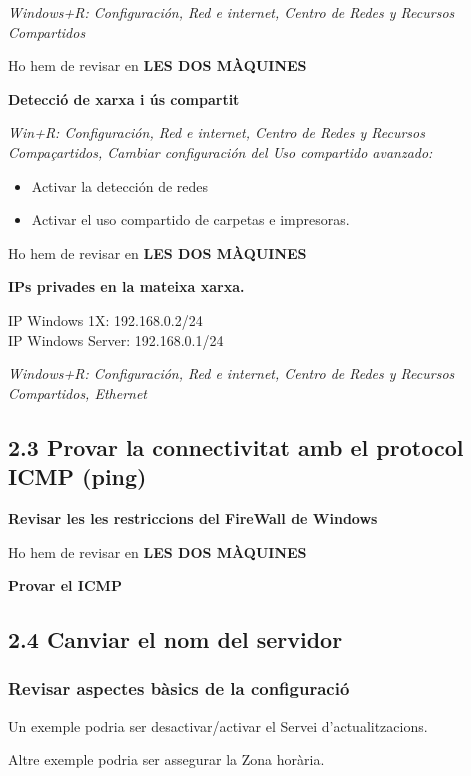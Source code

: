 \documentclass[
  a4paper,
]{article}
\providecommand{\tightlist}{%
  \setlength{\itemsep}{0pt}\setlength{\parskip}{0pt}}
\begin{document}
\emph{Windows+R: Configuración, Red e internet, Centro de Redes y
Recursos Compartidos}

Ho hem de revisar en \textbf{LES DOS MÀQUINES}

\textbf{Detecció de xarxa i ús compartit}

\emph{Win+R: Configuración, Red e internet, Centro de Redes y Recursos
Compaçartidos, Cambiar configuración del Uso compartido avanzado:}

\begin{itemize}
\tightlist
\item
  Activar la detección de redes
\item
  Activar el uso compartido de carpetas e impresoras.
\end{itemize}

Ho hem de revisar en \textbf{LES DOS MÀQUINES}

\textbf{IPs privades en la mateixa xarxa.}

IP Windows 1X: 192.168.0.2/24\\
IP Windows Server: 192.168.0.1/24

\emph{Windows+R: Configuración, Red e internet, Centro de Redes y
Recursos Compartidos, Ethernet}

\subsection{2.3 Provar la connectivitat amb el protocol ICMP
(ping)}\label{provar-la-connectivitat-amb-el-protocol-icmp-ping}

\textbf{Revisar les les restriccions del FireWall de Windows}

Ho hem de revisar en \textbf{LES DOS MÀQUINES}

\textbf{Provar el ICMP}

\subsection{2.4 Canviar el nom del
servidor}\label{canviar-el-nom-del-servidor}

\subsubsection{Revisar aspectes bàsics de la
configuració}\label{revisar-aspectes-buxe0sics-de-la-configuraciuxf3}

Un exemple podria ser desactivar/activar el Servei d'actualitzacions.

Altre exemple podria ser assegurar la Zona horària.
\end{document}
